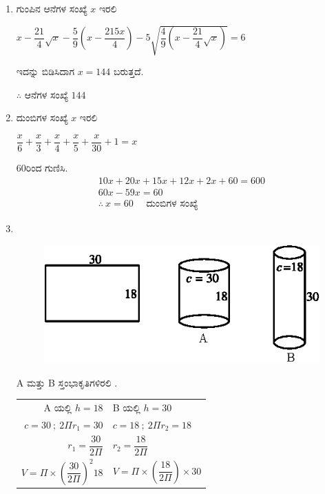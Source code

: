 \begin{enumerate}
\item ಗುಂಪಿನ ಆನೆಗಳ ಸಂಖ್ಯೆ $x$ ಇರಲಿ 

$x - \dfrac{21}{4} \sqrt{x} - \dfrac{5}{9} \left(x - \dfrac{215x}{4}\right) - 5 \sqrt{\dfrac{4}{9} \left(x - \dfrac{21}{4} \sqrt{x}\right)} = 6$

\vskip 0.1cm

ಇದನ್ನು ಬಿಡಿಸಿದಾಗ $x = 144$ ಬರುತ್ತದೆ. 

$\therefore$ ಆನೆಗಳ ಸಂಖ್ಯೆ $144$

\item ದುಂಬಿಗಳ ಸಂಖ್ಯೆ $x$ ಇರಲಿ 

\vskip 0.2cm

$\dfrac{x}{6} + \dfrac{x}{3} + \dfrac{x}{4} + \dfrac{x}{5} + \dfrac{x}{30} + 1 = x$

\vskip 0.2cm

60ರಿಂದ ಗುಣಿಸಿ. 
\begin{gather*}
10x + 20x + 15x + 12x + 2x + 60 = 600\\
60x - 59x = 60\\
\therefore~ x = 60 \quad\text{ ದುಂಬಿಗಳ ಸಂಖ್ಯೆ}
\end{gather*}

\item 
~

\begin{figure}[H]
\centering
\includegraphics[scale=1.2]{images/chap9/ans26.eps}
\end{figure}

A ಮತ್ತು B ಸ್ತಂಭಾಕೃತಿಗಳಿರಲಿ . 

\begin{tabular}[t]{rl}
A ಯಲ್ಲಿ \quad $h = 18$ & B ಯಲ್ಲಿ \quad $h = 30$\\[0.1cm]
$c = 30 ~;~ 2\Pi r_{1} = 30$  & $c = 18 ~;~ 2\Pi r_{2} = 18$\\[0.1cm]
$r_{1} = \dfrac{30}{2\Pi}$ & $r_{2} = \dfrac{18}{2\Pi}$\\[0.2cm]
$V = \Pi\times \left(\dfrac{30}{2\Pi}\right)^{2} 18$ & $V = \Pi\times \left(\dfrac{18}{2\Pi}\right) \times 30$
\end{tabular}


\end{enumerate}
